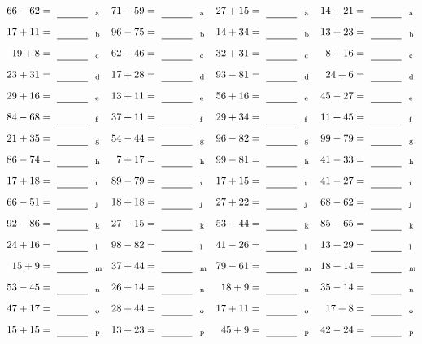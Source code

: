 \documentclass
[
  draft    = true,
  fontsize = 11pt,
  parskip  = half-
]
{scrartcl}
\begin{document}
\clearpage
\begin{align*}
    \pline{66-62}&=\rline{a}
  & \pline{71-59}&=\rline{a}
  & \pline{27+15}&=\rline{a}
  & \pline{14+21}&=\rline{a} \\[1ex]
    \pline{17+11}&=\rline{b}
  & \pline{96-75}&=\rline{b}
  & \pline{14+34}&=\rline{b}
  & \pline{13+23}&=\rline{b} \\[1ex]
    \pline{19+8}&=\rline{c}
  & \pline{62-46}&=\rline{c}
  & \pline{32+31}&=\rline{c}
  & \pline{8+16}&=\rline{c} \\[1ex]
    \pline{23+31}&=\rline{d}
  & \pline{17+28}&=\rline{d}
  & \pline{93-81}&=\rline{d}
  & \pline{24+6}&=\rline{d} \\[1ex]
    \pline{29+16}&=\rline{e}
  & \pline{13+11}&=\rline{e}
  & \pline{56+16}&=\rline{e}
  & \pline{45-27}&=\rline{e} \\[1ex]
    \pline{84-68}&=\rline{f}
  & \pline{37+11}&=\rline{f}
  & \pline{29+34}&=\rline{f}
  & \pline{11+45}&=\rline{f} \\[1ex]
    \pline{21+35}&=\rline{g}
  & \pline{54-44}&=\rline{g}
  & \pline{96-82}&=\rline{g}
  & \pline{99-79}&=\rline{g} \\[1ex]
    \pline{86-74}&=\rline{h}
  & \pline{7+17}&=\rline{h}
  & \pline{99-81}&=\rline{h}
  & \pline{41-33}&=\rline{h} \\[1ex]
    \pline{17+18}&=\rline{i}
  & \pline{89-79}&=\rline{i}
  & \pline{17+15}&=\rline{i}
  & \pline{41-27}&=\rline{i} \\[1ex]
    \pline{66-51}&=\rline{j}
  & \pline{18+18}&=\rline{j}
  & \pline{27+22}&=\rline{j}
  & \pline{68-62}&=\rline{j} \\[1ex]
    \pline{92-86}&=\rline{k}
  & \pline{27-15}&=\rline{k}
  & \pline{53-44}&=\rline{k}
  & \pline{85-65}&=\rline{k} \\[1ex]
    \pline{24+16}&=\rline{l}
  & \pline{98-82}&=\rline{l}
  & \pline{41-26}&=\rline{l}
  & \pline{13+29}&=\rline{l} \\[1ex]
    \pline{15+9}&=\rline{m}
  & \pline{37+44}&=\rline{m}
  & \pline{79-61}&=\rline{m}
  & \pline{18+14}&=\rline{m} \\[1ex]
    \pline{53-45}&=\rline{n}
  & \pline{26+14}&=\rline{n}
  & \pline{18+9}&=\rline{n}
  & \pline{35-14}&=\rline{n} \\[1ex]
    \pline{47+17}&=\rline{o}
  & \pline{28+44}&=\rline{o}
  & \pline{17+11}&=\rline{o}
  & \pline{17+8}&=\rline{o} \\[1ex]
    \pline{15+15}&=\rline{p}
  & \pline{13+23}&=\rline{p}
  & \pline{45+9}&=\rline{p}
  & \pline{42-24}&=\rline{p}
\end{align*}
\end{document}
